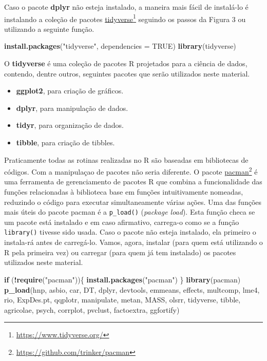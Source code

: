 \documentclass[
]{book}
\makeatletter
\newenvironment{Shaded}{\begin{snugshade}}{\end{snugshade}}
\newcommand{\ControlFlowTok}[1]{\textcolor[rgb]{0.13,0.29,0.53}{\textbf{#1}}}
\newcommand{\DataTypeTok}[1]{\textcolor[rgb]{0.13,0.29,0.53}{#1}}
\newcommand{\KeywordTok}[1]{\textcolor[rgb]{0.13,0.29,0.53}{\textbf{#1}}}
\newcommand{\NormalTok}[1]{#1}
\newcommand{\OperatorTok}[1]{\textcolor[rgb]{0.81,0.36,0.00}{\textbf{#1}}}
\newcommand{\OtherTok}[1]{\textcolor[rgb]{0.56,0.35,0.01}{#1}}
\newcommand{\StringTok}[1]{\textcolor[rgb]{0.31,0.60,0.02}{#1}}
\providecommand{\tightlist}{%
  \setlength{\itemsep}{0pt}\setlength{\parskip}{0pt}}
\numberwithin{equation}{section}
\newcommand{\indf}[1]{\index[function]{#1@\texttt{#1()}|ST}}
\makeatother
\begin{document}
Caso o pacote \textbf{dplyr} não esteja instalado, a maneira mais fácil de instalá-lo é instalando a coleção de pacotes \href{https://www.tidyverse.org/}{tidyverse}\footnote{\url{https://www.tidyverse.org/}} seguindo os passos da Figura 3 ou utilizando a seguinte função.

\begin{Shaded}
\begin{Highlighting}[]
\KeywordTok{install.packages}\NormalTok{(}\StringTok{"tidyverse"}\NormalTok{, }\DataTypeTok{dependencies =} \OtherTok{TRUE}\NormalTok{)}
\KeywordTok{library}\NormalTok{(tidyverse)}
\end{Highlighting}
\end{Shaded}

O \textbf{tidyverse} é uma coleção de pacotes R projetados para a ciência de dados, contendo, dentre outros, seguintes pacotes que serão utilizados neste material.

\begin{itemize}
\tightlist
\item
  \textbf{ggplot2}, para criação de gráficos.
\item
  \textbf{dplyr}, para manipulação de dados.
\item
  \textbf{tidyr}, para organização de dados.
\item
  \textbf{tibble}, para criação de tibbles.
\end{itemize}

Praticamente todas as rotinas realizadas no R são baseadas em bibliotecas de códigos. Com a manipulaçao de pacotes não seria diferente. O pacote \href{https://github.com/trinker/pacman}{pacman}\footnote{\url{https://github.com/trinker/pacman}} é uma ferramenta de gerenciamento de pacotes R que combina a funcionalidade das funções relacionadas à biblioteca base em funções intuitivamente nomeadas, reduzindo o código para executar simultaneamente várias ações. Uma das funções mais úteis do pacote pacman é a \texttt{p\_load()}\indf{p\_load} (\emph{package load}). Esta função checa se um pacote está instalado e em caso afirmativo, carrega-o como se a função \texttt{library()} tivesse sido usada. Caso o pacote não esteja instalado, ela primeiro o instala-rá antes de carregá-lo. Vamos, agora, instalar (para quem está utilizando o R pela primeira vez) ou carregar (para quem já tem instalado) os pacotes utilizados neste material.

\begin{Shaded}
\begin{Highlighting}[]
\ControlFlowTok{if}\NormalTok{ (}\OperatorTok{!}\KeywordTok{require}\NormalTok{(}\StringTok{"pacman"}\NormalTok{))\{}
\KeywordTok{install.packages}\NormalTok{(}\StringTok{"pacman"}\NormalTok{)}
\NormalTok{\}}
\KeywordTok{library}\NormalTok{(pacman)}
\KeywordTok{p\_load}\NormalTok{(hnp, asbio, car, DT, dplyr, devtools, emmeans, effects, multcomp,}
\NormalTok{       lme4, rio, ExpDes.pt, qqplotr, manipulate, metan, MASS, olsrr,}
\NormalTok{       tidyverse, tibble, agricolae, psych, corrplot, pvclust, factoextra, ggfortify)}
\end{Highlighting}
\end{Shaded}
\end{document}
